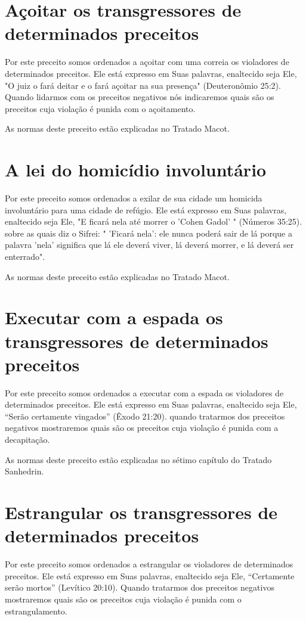 \section{Açoitar os transgressores de determinados preceitos}

Por este preceito somos ordenados a açoitar com uma correia os
vio­ladores de determinados preceitos. Ele está expresso em Suas
palavras, enalte­cido seja Ele, "O juiz o fará deitar e o fará açoitar
na sua presença" (Deuteronô­mio 25:2). Quando lidarmos com os preceitos
negativos nós indicaremos quais são os preceitos cuja violação é punida
com o açoitamento.

As normas deste preceito estão explicadas no Tratado Macot.

\section{A lei do homicídio involuntário}

Por este preceito somos ordenados a exilar de sua cidade um homi­cida
involuntário para uma cidade de refúgio. Ele está expresso em Suas
pala­vras, enaltecido seja Ele, "E ficará nela até morrer o 'Cohen
Gadol' " (Números 35:25). sobre as quais diz o Sifrei: " 'Ficará nela':
ele nunca poderá sair de lá porque a palavra 'nela' significa que lá ele
deverá viver, lá deverá morrer, e lá deverá ser enterrado".

As normas deste preceito estão explicadas no Tratado Macot.

\section{Executar com a espada os transgressores de determinados preceitos}

Por este preceito somos ordenados a executar com a espada os vio­ladores
de determinados preceitos. Ele está expresso em Suas palavras,
enalte­cido seja Ele, ``Serão certamente vingados'' (Êxodo 21:20). quando
tratarmos dos preceitos negativos mostraremos quais são os preceitos
cuja violação é pu­nida com a decapitação.

As normas deste preceito estão explicadas no sétimo capítulo do Tra­tado
Sanhedrin.

\section{Estrangular os transgressores de determinados preceitos}

Por este preceito somos ordenados a estrangular os violadores de
determinados preceitos. Ele está expresso em Suas palavras, enaltecido
seja Ele, ``Certamente serão mortos'' (Levítico 20:10). Quando tratarmos
dos preceitos negativos mostraremos quais são os preceitos cuja violação
é punida com o estrangulamento.

